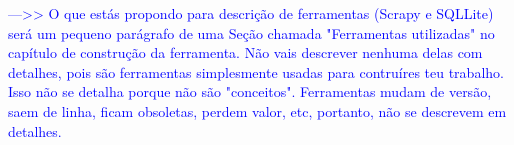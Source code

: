 \documentclass[
    12pt,                 %
    oneside,              %
    a4paper,              %
    chapter=TITLE,        %
    section=TITLE,        %
    english,              %
    brazil                %
    ]{abntex2}
\begin{document}
\pretextual%
\imprimircapa%

\imprimirfolhaderosto%

\afterpage{\null\newpage}



\begin{KeepFromToc}
    \tableofcontents
\end{KeepFromToc}




\textcolor{blue}{--->> O que estás propondo para descrição de ferramentas (Scrapy e SQLLite) será um pequeno parágrafo de uma Seção chamada "Ferramentas utilizadas" no capítulo de construção da ferramenta. Não vais descrever nenhuma delas com detalhes, pois são ferramentas simplesmente usadas para contruíres teu trabalho. Isso não se detalha porque não são "conceitos". Ferramentas mudam de versão, saem de linha, ficam obsoletas, perdem valor, etc, portanto, não se descrevem em detalhes.}







\end{document}
